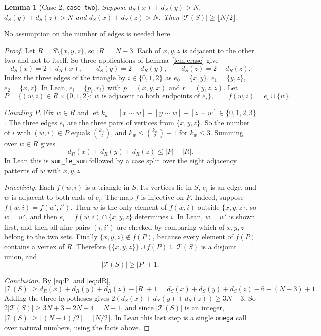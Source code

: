 \documentclass[11pt]{amsart}
\theoremstyle{plain}
\newtheorem{lemma}[theorem]{Lemma}
\theoremstyle{definition}
\newcommand{\Tri}{\mathcal{T}}
\newcommand{\adj}{\sim}
\newcommand{\lean}[1]{\texttt{#1}}
\begin{document}
\begin{lemma}[Case 2; \lean{case\_two}]\label{lem:case2}
Suppose $d_S(x)+d_S(y)>N$, $d_S(y)+d_S(z)>N$ and $d_S(x)+d_S(z)>N$. Then
$|\Tri(S)|\ge\lfloor N/2\rfloor$.
\end{lemma}
No assumption on the number of edges is needed here.
\begin{proof}
Let $R=S\setminus\{x,y,z\}$, so $|R|=N-3$. Each of $x,y,z$ is adjacent to the other two and not
to itself. So three applications of Lemma~\ref{lem:erase} give
\begin{equation}\label{eq:dR}
  d_S(x)=2+d_R(x),\qquad d_S(y)=2+d_R(y),\qquad d_S(z)=2+d_R(z).
\end{equation}
Index the three edges of the triangle by $i\in\{0,1,2\}$ as $e_0=\{x,y\}$, $e_1=\{y,z\}$,
$e_2=\{x,z\}$. In Lean, $e_i=\{p_i,r_i\}$ with $p=(x,y,x)$ and $r=(y,z,z)$. Let
\[
  P=\{(w,i)\in R\times\{0,1,2\}:\ w \text{ is adjacent to both endpoints of } e_i\},
  \qquad f(w,i)=e_i\cup\{w\}.
\]

\emph{Counting $P$.} Fix $w\in R$ and let $k_w=[x\adj w]+[y\adj w]+[z\adj w]\in\{0,1,2,3\}$. The
three edges $e_i$ are the three pairs of vertices from $\{x,y,z\}$. So the number of $i$ with
$(w,i)\in P$ equals $\binom{k_w}{2}$, and $k_w\le\binom{k_w}{2}+1$ for $k_w\le3$. Summing over
$w\in R$ gives
\begin{equation}\label{eq:P}
  d_R(x)+d_R(y)+d_R(z)\le|P|+|R|.
\end{equation}
In Lean this is \lean{sum\_le\_sum} followed by a case split over the eight adjacency patterns of
$w$ with $x,y,z$.

\emph{Injectivity.} Each $f(w,i)$ is a triangle in $S$. Its vertices lie in $S$, $e_i$ is an edge,
and $w$ is adjacent to both ends of $e_i$. The map $f$ is injective on $P$. Indeed, suppose
$f(w,i)=f(w',i')$. Then $w$ is the only element of $f(w,i)$ outside $\{x,y,z\}$, so $w=w'$, and
then $e_i=f(w,i)\cap\{x,y,z\}$ determines $i$. In Lean, $w=w'$ is shown first, and then all nine
pairs $(i,i')$ are checked by comparing which of $x,y,z$ belong to the two sets. Finally
$\{x,y,z\}\notin f(P)$, because every element of $f(P)$ contains a vertex of $R$. Therefore
$\{\{x,y,z\}\}\cup f(P)\subseteq\Tri(S)$ is a disjoint union, and
\[
  |\Tri(S)|\ge|P|+1.
\]

\emph{Conclusion.} By \eqref{eq:P} and \eqref{eq:dR},
\[
  |\Tri(S)|\ge d_R(x)+d_R(y)+d_R(z)-|R|+1=d_S(x)+d_S(y)+d_S(z)-6-(N-3)+1.
\]
Adding the three hypotheses gives $2(d_S(x)+d_S(y)+d_S(z))\ge3N+3$. So
$2|\Tri(S)|\ge 3N+3-2N-4=N-1$, and since $|\Tri(S)|$ is an integer,
$|\Tri(S)|\ge\lceil (N-1)/2\rceil=\lfloor N/2\rfloor$. In Lean this last step is a single
\lean{omega} call over natural numbers, using the facts above.
\end{proof}
\end{document}
